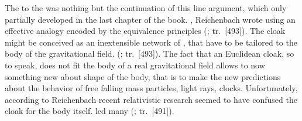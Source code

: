 \documentclass[draft]{article}
\newcommand{\PRZL}{\citetitle{Reichenbach1928}\xspace}
\renewcommand{\rzlap}[2]{(\cite[#1]{Reichenbach1928}; tr.\ [#2])\xspace}
\begin{document}

The \Ap to the \PRZL was nothing but the continuation of this line argument, which only partially developed in the last chapter of the book. , Reichenbach wrote using an effective analogy  encoded by the equivalence principles \rzlap{354}{493}. The cloak might be conceived as an inextensible network of \rac, that have to be tailored to the body of the gravitational field.  \rzlap{354}{493}. The fact that an Euclidean cloak, so to speak, does not fit the body of a real gravitational field allows to now something new about shape of the body, that is to make the new predictions about the behavior of free falling mass particles, light rays, clocks\etc. Unfortunately, according to Reichenbach recent relativistic research seemed to have confused the cloak for the body itself.  led many  \rzlap{352}{491}. 
\end{document}

